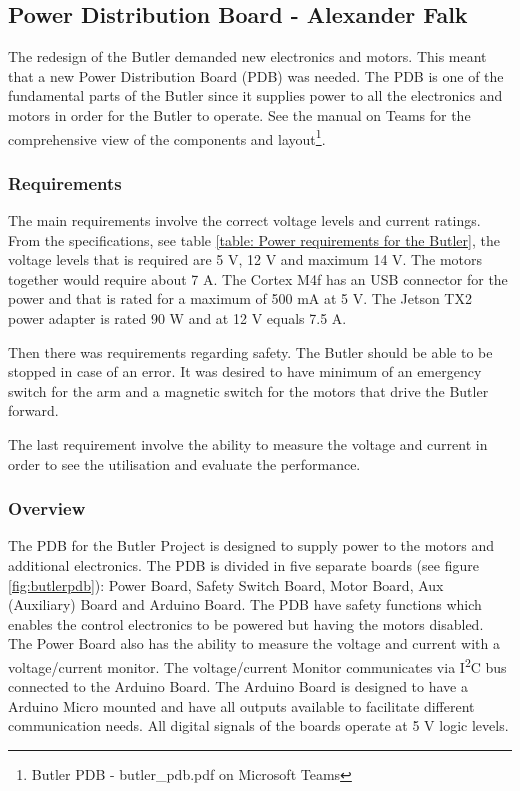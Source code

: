 \subsection{Power Distribution Board - Alexander Falk}
The redesign of the Butler demanded new electronics and motors. This meant that a new Power Distribution Board (PDB) was needed. The PDB is one of the fundamental parts of the Butler since it supplies power to all the electronics and motors in order for the Butler to operate. See the manual on Teams for the comprehensive view of the components and layout\footnote{Butler PDB - butler\_pdb.pdf on Microsoft Teams}.
\subsubsection{Requirements}
The main requirements involve the correct voltage levels and current ratings. From the specifications, see table \ref{table: Power requirements for the Butler}, the voltage levels that is required are 5 V, 12 V and maximum 14 V. The motors together would require about 7 A. The Cortex M4f has an USB connector for the power and that is rated for a maximum of 500 mA at 5 V. The Jetson TX2 power adapter is rated 90 W and at 12 V equals 7.5 A.

Then there was requirements regarding safety. The Butler should be able to be stopped in case of an error. It was desired to have minimum of an emergency switch for the arm and a magnetic switch for the motors that drive the Butler forward.

The last requirement involve the ability to measure the voltage and current in order to see the utilisation and evaluate the performance.
\subsubsection{Overview}
The PDB for the Butler Project is designed to supply power to the motors and additional electronics. The PDB is divided in five separate boards (see figure \ref{fig:butlerpdb}): Power Board, Safety Switch Board, Motor Board, Aux (Auxiliary) Board and Arduino Board. The PDB have safety functions which enables the control electronics to be powered but having the motors disabled. The Power Board also has the ability to measure the voltage and current with a voltage/current monitor. The voltage/current Monitor communicates via I\textsuperscript{2}C bus connected to the Arduino Board. The Arduino Board is designed to have a Arduino Micro mounted and have all outputs available to facilitate different communication needs. All digital signals of the boards operate at 5 V logic levels.

